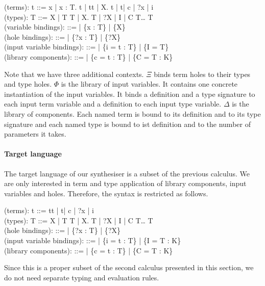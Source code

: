  \begin{plstx}
(terms): t ::= x | \lambda x : T.\; t | t\;t | \Lambda X.\; t | t\;[T] | c | {?x} | i\\
(types): T ::= X | T \rightarrow T | \forall X.\; T | ?X | I | C\; T\;\ldots\; T\\
(variable bindings): \Gamma ::= \emptyset | \Gamma \cup \{x : T\} | \Gamma \cup \{X\}\\
(hole bindings): \Xi ::= \emptyset | \Xi \cup \{{?x} : T\} | \Xi \cup \{{?X}\}\\
(input variable bindings): \Phi ::= \emptyset | \Phi \cup \{i = t : T\} | \Phi \cup \{I = T\}\\
(library components): \Delta ::= \emptyset | \Delta \cup \{c = t : T\} | \Delta \cup \{C = T : K\}\\
\end{plstx}
Note that we have three additional contexts. $\Xi$ binds term holes to their types and type holes.
$\Phi$ is the library of input variables. It contains one concrete instantiation of the input variables. It binds a definition and a type signature to each input term variable and a definition to each input type variable.
$\Delta$ is the library of components. Each named term is bound to its definition and to its type signature and each named type is bound to ist definition and to the number of parameters it takes.


\paragraph{Target language} The target language of our synthesiser is a subset of the previous calculus. We are only interested in term and type application of library components, input variables and holes. Therefore, the syntax is restricted as follows.
 \begin{plstx}
(terms): t ::= t\;t | t\;[T] | c | ?x | i\\
(types): T ::= X | T \rightarrow T | \forall X.\; T | ?X | I | C\; T\;\ldots\; T\\
(hole bindings): \Xi ::= \emptyset | \Xi \cup \{{?x} : T\} | \Xi \cup \{{?X}\}\\
(input variable bindings): \Phi ::= \emptyset | \Phi \cup \{i = t : T\} | \Phi \cup \{I = T : K\}\\
(library components): \Delta ::= \emptyset | \Delta \cup \{c = t : T\} | \Delta \cup \{C = T : K\}\\
\end{plstx}
Since this is a proper subset of the second calculus presented in this section, we do not need separate typing and evaluation rules.

